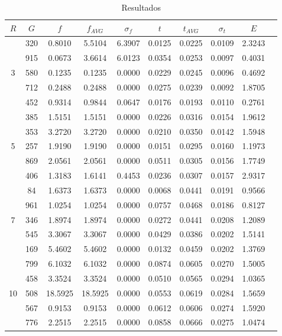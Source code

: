 \documentclass[journal]{IEEEtran}
\begin{document}
\begin{table}[h]
\caption{Resultados}
\centering

\begin{tabular}{|c|c|c|c|c|c|c|c|c|c|}
\hline
$R$ & $G$ & $f$ & $f_{AVG}$ & $\sigma_f$ & $t$ & $t_{AVG}$ & $\sigma_t$ & $E$ \\
\hline

\multirow{5}{*}{3}
& 320 & 0.8010 & 5.5104 & 6.3907 & 0.0125 & 0.0225 & 0.0109 & 2.3243 \\
& 915 & 0.0673 & 3.6614 & 6.0123 & 0.0354 & 0.0253 & 0.0097 & 0.4031 \\
& 580 & 0.1235 & 0.1235 & 0.0000 & 0.0229 & 0.0245 & 0.0096 & 0.4692 \\
& 712 & 0.2488 & 0.2488 & 0.0000 & 0.0275 & 0.0239 & 0.0092 & 1.8705 \\
& 452 & 0.9314 & 0.9844 & 0.0647 & 0.0176 & 0.0193 & 0.0110 & 0.2761 \\
\hline

\multirow{5}{*}{5}
& 385 & 1.5151 & 1.5151 & 0.0000 & 0.0226 & 0.0316 & 0.0154 & 1.9612 \\
& 353 & 3.2720 & 3.2720 & 0.0000 & 0.0210 & 0.0350 & 0.0142 & 1.5948 \\
& 257 & 1.9190 & 1.9190 & 0.0000 & 0.0151 & 0.0295 & 0.0160 & 1.1973 \\
& 869 & 2.0561 & 2.0561 & 0.0000 & 0.0511 & 0.0305 & 0.0156 & 1.7749 \\
& 406 & 1.3183 & 1.6141 & 0.4453 & 0.0236 & 0.0307 & 0.0157 & 2.9317 \\
\hline

\multirow{5}{*}{7}
& 84 & 1.6373 & 1.6373 & 0.0000 & 0.0068 & 0.0441 & 0.0191 & 0.9566 \\
& 961 & 1.0254 & 1.0254 & 0.0000 & 0.0757 & 0.0468 & 0.0186 & 0.8127 \\
& 346 & 1.8974 & 1.8974 & 0.0000 & 0.0272 & 0.0441 & 0.0208 & 1.2089 \\
& 545 & 3.3067 & 3.3067 & 0.0000 & 0.0429 & 0.0386 & 0.0202 & 1.5141 \\
& 169 & 5.4602 & 5.4602 & 0.0000 & 0.0132 & 0.0459 & 0.0202 & 1.3769 \\
\hline
 
\multirow{5}{*}{10}
& 799 & 6.1032 & 6.1032 & 0.0000 & 0.0874 & 0.0605 & 0.0270 & 1.5005 \\
& 458 & 3.3524 & 3.3524 & 0.0000 & 0.0510 & 0.0565 & 0.0294 & 1.0365 \\
& 508 & 18.5925 & 18.5925 & 0.0000 & 0.0553 & 0.0619 & 0.0284 & 1.5659 \\
& 567 & 0.9153 & 0.9153 & 0.0000 & 0.0612 & 0.0606 & 0.0274 & 1.5920 \\
& 776 & 2.2515 & 2.2515 & 0.0000 & 0.0858 & 0.0666 & 0.0275 & 1.0474 \\
\hline
 

\end{tabular}
\end{table}
\end{document}
